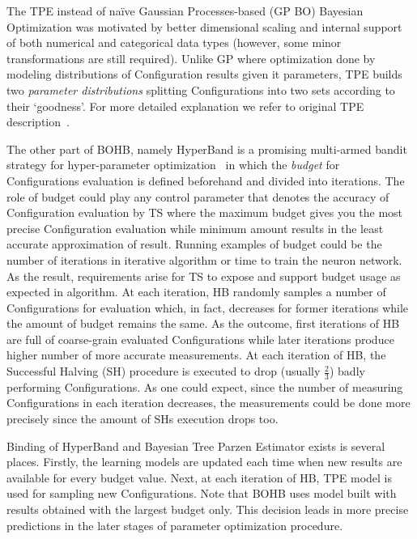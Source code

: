The TPE instead of na\"ive Gaussian Processes-based (GP BO) Bayesian Optimization was motivated by better dimensional scaling and internal support of both numerical and categorical data types (however, some minor transformations are still required). Unlike GP where optimization done by modeling distributions of Configuration results given it parameters, TPE builds two \textit{parameter distributions} splitting Configurations into two sets according to their `goodness'. For more detailed explanation we refer to original TPE description~\cite{bergstra2011algorithms}.

The other part of BOHB, namely HyperBand is a promising multi-armed bandit strategy for hyper-parameter optimization~\cite{li2017hyperband} in which the \textit{budget} for Configurations evaluation is defined beforehand and divided into iterations. The role of budget could play any control parameter that denotes the accuracy of Configuration evaluation by TS where the maximum budget gives you the most precise Configuration evaluation while minimum amount results in the least accurate approximation of result.
Running examples of budget could be the number of iterations in iterative algorithm or time to train the neuron network.
As the result, requirements arise for TS to expose and support budget usage as expected in algorithm.
At each iteration, HB randomly samples a number of Configurations for evaluation which, in fact, decreases for former iterations while the amount of budget remains the same. As the outcome, first iterations of HB are full of coarse-grain evaluated Configurations while later iterations produce higher number of more accurate measurements. At each iteration of HB, the Successful Halving (SH) procedure is executed to drop (usually $\frac{2}{3}$) badly performing Configurations. As one could expect, since the number of measuring Configurations in each iteration decreases, the measurements could be done more precisely since the amount of SHs execution drops too.

Binding of HyperBand and Bayesian Tree Parzen Estimator exists is several places. Firstly, the learning models are updated each time when new results are available for every budget value. Next, at each iteration of HB, TPE model is used for sampling new Configurations. Note that BOHB uses model built with results obtained with the largest budget only. This decision leads in more precise predictions in the later stages of parameter optimization procedure.

